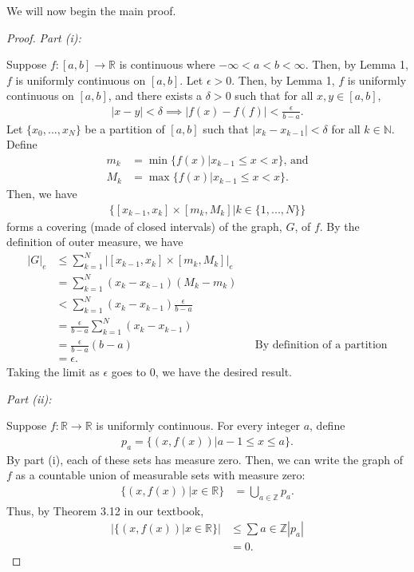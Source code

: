 \documentclass[10pt,a4paper]{article}
\makeatletter
\theoremstyle{theorem}
\newcommand{\proofpart}[2]{%
  \par
  \addvspace{\medskipamount}%
  \noindent\emph{Part #1: #2}\par\nobreak
  \addvspace{\smallskipamount}%
  \@afterheading
}
\theoremstyle{definition}
\makeatother
\begin{document}
We will now begin the main proof.
\begin{proof}
\proofpart{(i)}{}
Suppose $f:[a,b] \to \mathbb{R}$ is continuous where $-\infty < a < b < \infty$. Then, by Lemma 1, $f$ is uniformly continuous on $[a, b]$. Let $\epsilon > 0$. Then, by Lemma 1, $f$ is uniformly continuous on $[a, b]$, and there exists a $\delta > 0$ such that for all $x, y \in [a, b]$,
\begin{align*}
|x - y| < \delta \implies |f(x) - f(f)| < \frac{\epsilon}{b - a}.
\end{align*}
Let $\{x_0, ..., x_N\}$ be a partition of $[a, b]$ such that $|x_k - x_{k-1}| < \delta$ for all $k \in \mathbb{N}$. Define 
\begin{align*}
m_k &= \min\{f(x)| x_{k-1} \leq x < x\} \text{, and}\\
M_k &= \max\{f(x)| x_{k-1} \leq x < x\}.
\end{align*}
Then, we have
\begin{align*}
\{[x_{k-1}, x_k] \times [m_k, M_k] | k \in \{1, ..., N\} \}
\end{align*}
forms a covering (made of closed intervals) of the graph, $G$, of $f$. By the definition of outer measure, we have
\begin{align*}
|G|_e &\leq \sum_{k=1}^N |[x_{k-1}, x_k] \times [m_k, M_k]|_e\\
&= \sum_{k=1}^N (x_k - x_{k - 1}) (M_k - m_k)\\
&< \sum_{k=1}^N (x_k - x_{k - 1})\frac{\epsilon}{b - a} \\
&= \frac{\epsilon}{b - a}\sum_{k=1}^N (x_k - x_{k - 1})\\
&= \frac{\epsilon}{b - a} (b - a) &&\text{By definition of a partition}\\
&= \epsilon. 
\end{align*}
Taking the limit as $\epsilon$ goes to $0$, we have the desired result.
\proofpart{(ii)}{}
Suppose $f:\mathbb{R} \to \mathbb{R}$ is uniformly continuous. For every integer $a$, define 
\begin{align*}
p_a = \{(x, f(x))| a-1 \leq x \leq a\}.
\end{align*}
By part (i), each of these sets has measure zero. Then, we can write the graph of $f$ as a countable union of measurable sets with measure zero:
\begin{align*}
\{(x, f(x)) | x \in \mathbb{R} \} &= \bigcup_{a \in \mathbb{Z}} p_a.
\end{align*}
Thus, by Theorem 3.12 in our textbook,
\begin{align*}
|\{(x, f(x) )| x \in \mathbb{R} \}| &\leq \sum{a \in \mathbb{Z}} |p_a|\\
&= 0.
\end{align*}
\end{proof}
\end{document}
